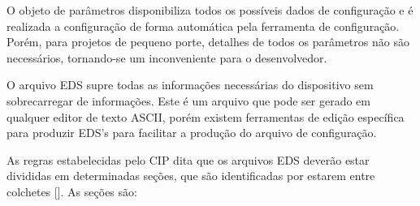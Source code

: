  O objeto de parâmetros disponibiliza todos os possíveis dados de configuração e é realizada a configuração de forma automática pela ferramenta de configuração. Porém, para projetos de pequeno porte, detalhes de todos os parâmetros não são necessários, tornando-se um inconveniente para o desenvolvedor.
 
 O arquivo EDS supre todas as informações necessárias do dispositivo sem sobrecarregar de informações. Este é um arquivo que pode ser gerado em qualquer editor de texto ASCII, porém existem ferramentas de edição específica para produzir EDS's para facilitar a produção do arquivo de configuração.
 
 As regras estabelecidas pelo CIP dita que os arquivos EDS deverão estar divididas em determinadas seções, que são identificadas por estarem entre colchetes []. As seções são:
 
